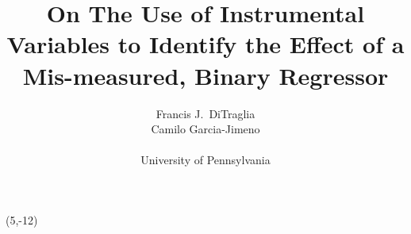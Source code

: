 \documentclass[12pt]{article}
\begin{document}
\title{On The Use of Instrumental Variables to Identify the Effect of a Mis-measured, Binary Regressor}

\author{Francis J.\ DiTraglia \\ Camilo Garcia-Jimeno\\  \\
		University of Pennsylvania}

\maketitle 
\begin{abstract}
	
\end{abstract}

\begin{textblock}{2}(5,-12)
\begin{rotate}{0}
\end{rotate}
\end{textblock}




%
%

%
\end{document}

